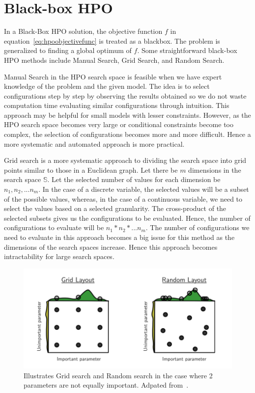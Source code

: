 \documentclass[12pt, twoside, ngerman]{report}
\begin{document}
\section{Black-box HPO}
In a Black-Box HPO solution, the objective function $f$ in equation~\ref{eq:hpoobjectivefunc}
is treated as a blackbox.
The problem is generalized to finding a global optimum of $f$.
Some straightforward black-box HPO methods include Manual Search,  Grid Search, and Random Search.

Manual Search in the HPO search space is feasible when we have expert knowledge of the problem and the given model. 
The idea is to select configurations step by step by observing the results obtained so we do not waste computation time evaluating similar configurations through intuition.
This approach may be helpful for small models with lesser constraints.
However, as the HPO search space becomes very large or conditional constraints become too complex, the selection of configurations becomes more and more difficult.
Hence a more systematic and automated approach is more practical.

Grid search is a more systematic approach to dividing the search space into grid points similar to those in a Euclidean graph.
Let there be $m$ dimensions in the search space $\mathbb{S}$. Let the selected number of values for each dimension be $n_1, n_2, ... n_m$. In the case of a discrete variable, the selected values will be a subset of the possible values, whereas, in the case of a continuous variable, we need to select the values based on a selected granularity.
The cross-product of the selected subsets gives us the configurations to be evaluated. Hence, the number of configurations to evaluate will be $n_1 * n_2 * ... n_m$.
The number of configurations we need to evaluate in this approach becomes a big issue for this method as the dimensions of the search spaces increase.
Hence this approach becomes intractability for large search spaces.

\begin{figure}[htb]
  \centering
    \includegraphics[scale=0.8]{images/rsgsexample}
    \caption{Illustrates Grid search and Random search in the case where 2 parameters are not equally important.  Adpated from~\cite{rshpoarticle}.}
    \label{fig:rshpofig}
\end{figure}
\end{document}
